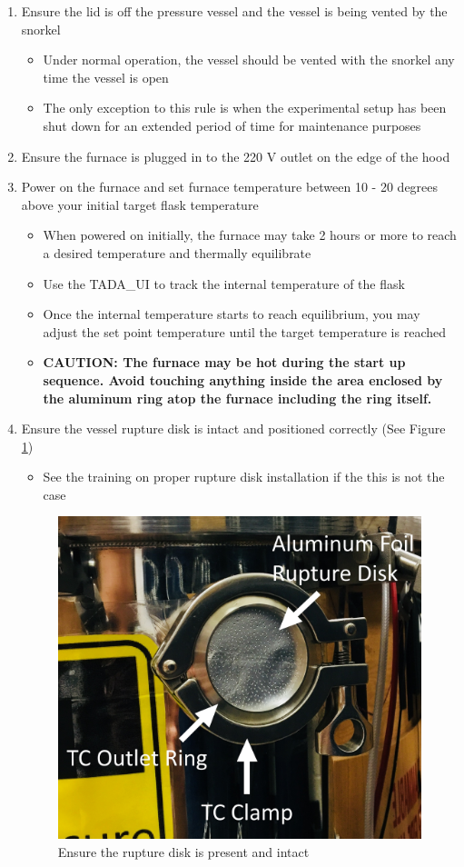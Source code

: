 \documentclass[letterpaper,11pt]{article}
\begin{document}
    \begin{enumerate}
    \item Ensure the lid is off the pressure vessel and the vessel is being 
        vented by the snorkel
        \begin{itemize}
        \item Under normal operation, the vessel should be vented with the 
            snorkel any time the vessel is open
        \item The only exception to this rule is when the experimental setup has
            been shut down for an extended period of time for maintenance 
            purposes
        \end{itemize}
    
    \item Ensure the furnace is plugged in to the 220 V outlet on the edge of 
        the hood
    \item Power on the furnace and set furnace temperature between 10 - 20 
        degrees above your initial target flask temperature 
        \begin{itemize}
        \item When powered on initially, the furnace may take 2 hours or   
            more to reach a desired temperature and thermally equilibrate
        \item Use the TADA\_UI to track the internal temperature of the flask
        \item Once the internal temperature starts to reach equilibrium, you 
            may adjust the set point temperature until the target 
            temperature is reached
        \item \textbf{CAUTION: The furnace may be hot during the start up 
            sequence. Avoid touching anything inside the area enclosed by 
            the aluminum ring atop the furnace including the ring itself.}
        \end{itemize}
    
    \item Ensure the vessel rupture disk is intact and positioned correctly 
        (See Figure \ref{fig:rupture_disk})
        \begin{itemize}
        \item See the training on proper rupture disk installation if the this is not the case
        \end{itemize} 
    
\begin{figure}[H]
\centering
\includegraphics[width=.25\textwidth]{rupture_disk.jpg}
\caption{Ensure the rupture disk is present and intact}
\label{fig:rupture_disk}
\end{figure}
    

\end{enumerate}
\end{document}
